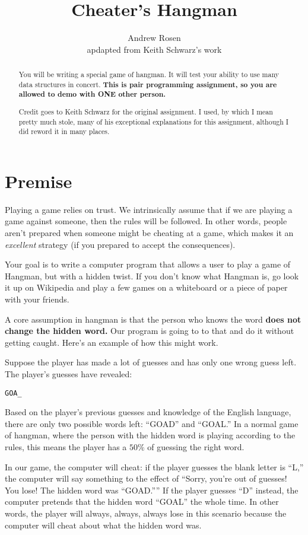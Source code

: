 \documentclass[10pt,letterpaper]{article}
\author{Andrew Rosen\\ apdapted from  Keith Schwarz's work}
\title{Cheater's Hangman}
\date{}
\begin{document}
	
	\maketitle
	\begin{abstract}
		You will be writing a special game of hangman.
		It will test your ability to use many data structures in concert.
		\textbf{This is pair programming assignment, so you are allowed to demo with ONE other person.}
		
		Credit goes to Keith Schwarz for the original assignment.
		I used, by which I mean pretty much stole, many of his exceptional explanations for this assignment, although I did reword it in many places.
	\end{abstract}

	\section{Premise}
	
	Playing a game relies on trust. 
	We intrinsically assume that if we are playing a game against someone, then the rules will be followed.
	In other words, people aren't prepared when someone might be cheating at a game, which makes it an \textit{excellent} strategy (if you prepared to accept the consequences).
	
	Your goal is to write a computer program that allows a user to play a game of Hangman, but with a hidden twist.
	If you don't know what Hangman is, go look it up on Wikipedia and play a few games on a whiteboard or a piece of paper with your friends.
	
	A core assumption in hangman is that the person who knows the word \textbf{does not change the hidden word.}
	Our program is going to to that and do it without getting caught.
	Here's an example of how this might work.
	
	
	Suppose the player has made a lot of guesses and has only one wrong guess left.
	The player's guesses have revealed:

\begin{verbatim}
GOA_
\end{verbatim}

Based on the player's previous guesses and knowledge of the English language, there are only two possible words left: ``GOAD'' and ``GOAL.''
In a normal game of hangman, where the person with the hidden word is playing according to the rules, this means the player has a $ 50\% $ of guessing the right word.

In our game, the computer will cheat:  if the player guesses the blank letter is ``L,'' the computer will say something to the effect of ``Sorry, you're out of guesses! You lose!  The hidden word was ``GOAD.''''
If the player guesses ``D'' instead, the computer pretends that the hidden word ``GOAL'' the whole time.
In other words, the player will always, always, always lose in this scenario because the computer will cheat about what the hidden word was.
\end{document}
